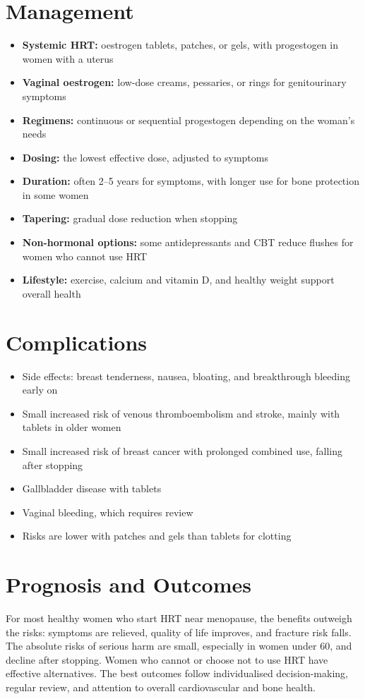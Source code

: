 \section*{Management}
\begin{itemize}
    \item \textbf{Systemic HRT:} oestrogen tablets, patches, or gels, with progestogen in women with a uterus
    \item \textbf{Vaginal oestrogen:} low-dose creams, pessaries, or rings for genitourinary symptoms
    \item \textbf{Regimens:} continuous or sequential progestogen depending on the woman's needs
    \item \textbf{Dosing:} the lowest effective dose, adjusted to symptoms
    \item \textbf{Duration:} often 2--5 years for symptoms, with longer use for bone protection in some women
    \item \textbf{Tapering:} gradual dose reduction when stopping
    \item \textbf{Non-hormonal options:} some antidepressants and CBT reduce flushes for women who cannot use HRT
    \item \textbf{Lifestyle:} exercise, calcium and vitamin D, and healthy weight support overall health
\end{itemize}

\section*{Complications}
\begin{itemize}
    \item Side effects: breast tenderness, nausea, bloating, and breakthrough bleeding early on
    \item Small increased risk of venous thromboembolism and stroke, mainly with tablets in older women
    \item Small increased risk of breast cancer with prolonged combined use, falling after stopping
    \item Gallbladder disease with tablets
    \item Vaginal bleeding, which requires review
    \item Risks are lower with patches and gels than tablets for clotting
\end{itemize}

\section*{Prognosis and Outcomes}
For most healthy women who start HRT near menopause, the benefits outweigh the risks: symptoms are relieved, quality of life improves, and fracture risk falls. The absolute risks of serious harm are small, especially in women under 60, and decline after stopping. Women who cannot or choose not to use HRT have effective alternatives. The best outcomes follow individualised decision-making, regular review, and attention to overall cardiovascular and bone health.


